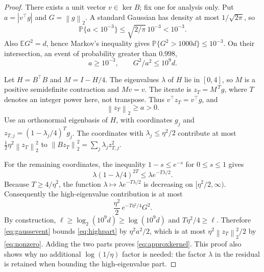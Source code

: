 \documentclass[11pt,a4paper]{article}
\theoremstyle{remark}
\newcommand{\E}{\mathbb E}
\newcommand{\PP}{\mathbb P}
\newcommand{\norm}[1]{\left\|#1\right\|_2}
\begin{document}
\begin{proof}
There exists a unit vector $v\in\ker B$; fix one for analysis only.
Put $a=|v^\top g|$ and $G=\norm{g}$. A standard Gaussian has density at most
$1/\sqrt{2\pi}$, so
\[
 \PP\{a<10^{-3}\}\le\sqrt{2/\pi}\,10^{-3}<10^{-3}.
\]
Also $\E G^2=d$, hence Markov's inequality gives
$\PP\{G^2>1000d\}\le10^{-3}$. On their intersection, an event of probability
greater than $0.998$,
\begin{equation}\label{eq:gaussevent}
 a\ge10^{-3},\qquad G^2/a^2\le10^9d.
\end{equation}

Let $H=B^\top B$ and $M=I-H/4$. The eigenvalues $\lambda$ of $H$ lie in
$[0,4]$, so $M$ is a positive semidefinite contraction and $Mv=v$.
The iterate is $z_T=M^{\,T}g$, where $T$ denotes an integer power here,
not transpose. Thus $v^\top z_T=v^\top g$, and
\begin{equation}\label{eq:nonzero}
 \norm{z_T}\ge a>0.
\end{equation}
Use an orthonormal eigenbasis of $H$, with coordinates $g_j$ and
$z_{T,j}=(1-\lambda_j/4)^Tg_j$. The coordinates with
$\lambda_j\le\eta^2/2$ contribute at most
$\frac12\eta^2\norm{z_T}^2$ to
$\norm{Bz_T}^2=\sum_j\lambda_j z_{T,j}^2$.

For the remaining coordinates, the inequality $1-s\le e^{-s}$ for
$0\le s\le1$ gives
\[
 \lambda(1-\lambda/4)^{2T}\le\lambda e^{-T\lambda/2}.
\]
Because $T\ge4/\eta^2$, the function
$\lambda\mapsto\lambda e^{-T\lambda/2}$ is decreasing on
$[\eta^2/2,\infty)$. Consequently the high-eigenvalue contribution is at most
\begin{equation}\label{eq:highpart}
 \frac{\eta^2}{2}\,e^{-T\eta^2/4}G^2.
\end{equation}
By construction, $\ell\ge\log_2(10^9d)\ge\log(10^9d)$ and
$T\eta^2/4\ge\ell$. Therefore \eqref{eq:gaussevent} bounds
\eqref{eq:highpart} by $\eta^2a^2/2$, which is at most
$\eta^2\norm{z_T}^2/2$ by \eqref{eq:nonzero}. Adding the two parts proves
\eqref{eq:approxkernel}. This proof also shows why no additional
$\log(1/\eta)$ factor is needed: the factor $\lambda$ in the residual is
retained when bounding the high-eigenvalue part.
\end{proof}
\end{document}
